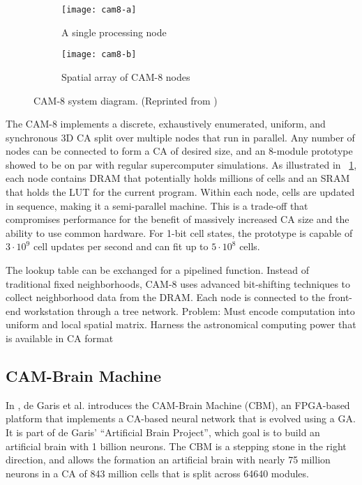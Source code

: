 \begin{figure}[!ht]
    \centering
    \begin{subfigure}{0.48\textwidth}
        \centering
        \texttt{[image: cam8-a]}
        \caption{A single processing node}
    \end{subfigure}
    \begin{subfigure}{0.48\textwidth}
        \centering
        \texttt{[image: cam8-b]}
        \caption{Spatial array of CAM-8 nodes}
    \end{subfigure}
    \caption[CAM-8 system diagram]{
        CAM-8 system diagram.
        (Reprinted from \cite{margolus1996cam8})
    }
    \label{fig:cam-8}
\end{figure}

The CAM-8 implements a discrete, exhaustively enumerated, uniform, and synchronous 3D CA split over multiple nodes that run in parallel.
Any number of nodes can be connected to form a CA of desired size, and an 8-module prototype showed to be on par with regular supercomputer simulations.
As illustrated in \figurename~\ref{fig:cam-8}, each node contains DRAM that potentially holds millions of cells and an SRAM that holds the LUT for the current program.
Within each node, cells are updated in sequence, making it a semi-parallel machine.
This is a trade-off that compromises performance for the benefit of massively increased CA size and the ability to use common hardware.
For 1-bit cell states, the prototype is capable of $3 \cdot 10^9$ cell updates per second and can fit up to $5 \cdot 10^8$ cells.

The lookup table can be exchanged for a pipelined function.
Instead of traditional fixed neighborhoods, CAM-8 uses advanced bit-shifting techniques to collect neighborhood data from the DRAM.
Each node is connected to the front-end workstation through a tree network.
Problem: Must encode computation into uniform and local spatial matrix.
Harness the astronomical computing power that is available in CA format

\subsection{CAM-Brain Machine}

In \cite{degaris2001cbm}, de Garis et al. introduces the CAM-Brain Machine (CBM), an FPGA-based platform that implements a CA-based neural network that is evolved using a GA.
It is part of de Garis' ``Artificial Brain Project'', which goal is to build an artificial brain with 1 billion neurons.
The CBM is a stepping stone in the right direction, and allows the formation an artificial brain with nearly 75 million neurons in a CA of 843 million cells that is split across 64640 modules.

